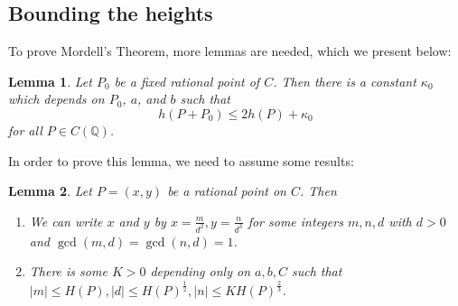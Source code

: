 \documentclass[12pt]{article}
\newtheorem{lemma}{Lemma}[subsection]
\theoremstyle{remark}
\theoremstyle{definition}
\begin{document}
    \subsection{Bounding the heights}
        To prove Mordell's Theorem, more lemmas are needed, which we present below:
    
        \begin{lemma}\label{lemma-bound-h-add}
            Let $P_0$ be a fixed rational point of $C$. Then there is a constant $\kappa_0$ which depends on $P_0$, $a$, and $b$ such that
            $$h(P+P_0)\leqslant 2h(P) + \kappa_0$$
            for all $P\in C(\mathbb{Q})$.
        \end{lemma}

        In order to prove this lemma, we need to assume some results:
        \begin{lemma}\label{lemma-mordell-assump}
            Let $P = (x, y)$ be a rational point on $C$. Then
            \begin{enumerate}[\normalfont(i)]
                \item We can write $x$ and $y$ by $x = \frac{m}{d^2}, y = \frac{n}{d^3}$ for some integers $m,n,d$ with $d>0$ and $\gcd(m,d)=\gcd(n,d)=1$.
                \item There is some $K>0$ depending only on $a, b, C$ such that $\lvert m \rvert \leqslant H(P), \lvert d \rvert \leqslant H(P)^\frac{1}{2}, \lvert n \rvert \leqslant KH(P)^\frac{2}{3}$.
            \end{enumerate}
        \end{lemma}
\end{document}
